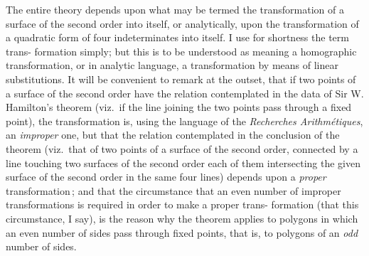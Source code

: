 \documentclass[11pt,a4paper]{article}
\theoremstyle{definition}
\begin{document}
\bigskip

The entire theory depends upon what may be termed the transformation of a
surface of the second order into itself, or analytically, upon the transformation of a
quadratic form of four indeterminates into itself. I use for shortness the term trans-
formation simply; but this is to be understood as meaning a homographic transformation,
or in analytic language, a transformation by means of linear substitutions. It will
be convenient to remark at the outset, that if two points of a surface of the second
order have the relation contemplated in the data of Sir W. Hamilton's theorem (viz.\
if the line joining the two points pass through a fixed point), the transformation is,
using the language of the \textit{Recherches Arithm\'etiques}, an \textit{improper} one, but that the
relation contemplated in the conclusion of the theorem (viz.\ that of two points of a
surface of the second order, connected by a line touching two surfaces of the second
order each of them intersecting the given surface of the second order in the same
four lines) depends upon a \textit{proper} transformation\,; and that the circumstance that an
even number of improper transformations is required in order to make a proper trans-
formation (that this circumstance, I say), is the reason why the theorem applies to
polygons in which an even number of sides pass through fixed points, that is, to
polygons of an \textit{odd} number of sides.

\medskip
\end{document}
